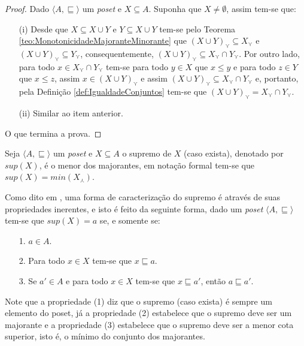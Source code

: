 \begin{proof}
	Dado $\langle A, \sqsubseteq \rangle$ um \textit{poset} e $X \subseteq A$. Suponha que $X \neq \emptyset$, assim tem-se que:
	\begin{itemize}
		\item[(i)] Desde que $X \subseteq X \cup Y$ e  $Y \subseteq X \cup Y$ tem-se pelo Teorema \ref{teo:MonotonicidadeMajoranteMinorante} que $(X \cup Y)_\curlyvee \subseteq X_\curlyvee$ e  $(X \cup Y)_\curlyvee \subseteq Y_\curlyvee $, consequentemente, $(X \cup Y)_\curlyvee \subseteq X_\curlyvee \cap Y_\curlyvee$. Por outro lado, para todo $x \in X_\curlyvee \cap Y_\curlyvee$ tem-se para todo $y \in X$ que $x \leq y$ e para todo $z \in Y$ que $x \leq z$, assim $x \in (X \cup Y)_\curlyvee$ e assim $(X \cup Y)_\curlyvee \subseteq X_\curlyvee \cap Y_\curlyvee$ e, portanto, pela Definição \ref{def:IgualdadeConjuntos}  tem-se que $(X \cup Y)_\curlyvee = X_\curlyvee \cap Y_\curlyvee$.
		\item[(ii)] Similar ao item anterior.
	\end{itemize}
	O que termina a prova.
\end{proof}

\begin{definition}[Supremo]\label{def:Supermo}
	Seja $\langle A, \sqsubseteq \rangle$ um \textit{poset} e $X \subseteq A$ o supremo de $X$ (caso exista), denotado por $sup(X)$, é o menor dos majorantes, em notação formal tem-se que $sup(X) = min(X_\curlywedge)$.
\end{definition}

Como dito em \cite{abe1991-TC, carmo2013}, uma forma de caracterização do supremo é através de suas propriedades inerentes, e isto é feito da seguinte forma, dado um \textit{poset} $\langle A, \sqsubseteq \rangle$ tem-se que $sup(X) = a $ se, e somente se:

\begin{itemize}
	\item[1.] $a \in A$.
	\item[2.] Para todo $x \in X$ tem-se que $x \sqsubseteq a$.
	\item[3.] Se $a' \in A$ e para todo $x \in X$ tem-se que  $x \sqsubseteq a'$, então $a \sqsubseteq a'$.
\end{itemize}

Note que a propriedade (1) diz que o supremo (caso exista) é sempre um elemento do poset, já a propriedade (2) estabelece que o supremo deve ser um majorante e a propriedade (3) estabelece que o supremo deve ser a menor cota superior, isto é, o mínimo do conjunto dos majorantes.

